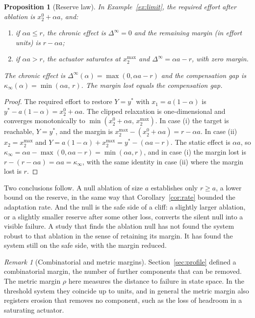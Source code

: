 \documentclass[11pt]{article}
\newtheorem{proposition}[theorem]{Proposition}
\theoremstyle{definition}
\theoremstyle{remark}
\newtheorem{remark}[theorem]{Remark}
\begin{document}
\begin{proposition}[Reserve law]\label{prop:reserve}
In Example~\ref{ex:limit}, the required effort after ablation is $x_2^0+\alpha a$, and:
\begin{enumerate}[label=(\roman*)]
\item if $\alpha a\le r$, the chronic effect is $\Delta^\infty=0$ and the remaining margin (in effort units) is $r-\alpha a$;
\item if $\alpha a>r$, the actuator saturates at $x_2^{\max}$ and $\Delta^\infty=\alpha a-r$, with zero margin.
\end{enumerate}
The chronic effect is $\Delta^\infty(\alpha)=\max(0,\alpha a-r)$ and the compensation gap is $\kappa_\infty(\alpha)=\min(\alpha a,\,r)$. The margin lost equals the compensation gap.
\end{proposition}
\begin{proof}
The required effort to restore $Y=y^*$ with $x_1=a(1-\alpha)$ is $y^*-a(1-\alpha)=x_2^0+\alpha a$. The clipped relaxation is one-dimensional and converges monotonically to $\min(x_2^0+\alpha a,\,x_2^{\max})$. In case (i) the target is reachable, $Y=y^*$, and the margin is $x_2^{\max}-(x_2^0+\alpha a)=r-\alpha a$. In case (ii) $x_2=x_2^{\max}$ and $Y=a(1-\alpha)+x_2^{\max}=y^*-(\alpha a-r)$. The static effect is $\alpha a$, so $\kappa_\infty=\alpha a-\max(0,\alpha a-r)=\min(\alpha a,r)$, and in case (i) the margin lost is $r-(r-\alpha a)=\alpha a=\kappa_\infty$, with the same identity in case (ii) where the margin lost is $r$.
\end{proof}

Two conclusions follow. A null ablation of size $a$ establishes only $r\ge a$, a lower bound on the reserve, in the same way that Corollary~\ref{cor:rate} bounded the adaptation rate. And the null is the safe side of a cliff: a slightly larger ablation, or a slightly smaller reserve after some other loss, converts the silent null into a visible failure. A study that finds the ablation null has not found the system robust to that ablation in the sense of retaining its margin. It has found the system still on the safe side, with the margin reduced.

\begin{remark}[Combinatorial and metric margins]
Section~\ref{sec:profile} defined a combinatorial margin, the number of further components that can be removed. The metric margin $\rho$ here measures the distance to failure in state space. In the threshold system they coincide up to units, and in general the metric margin also registers erosion that removes no component, such as the loss of headroom in a saturating actuator.
\end{remark}
\end{document}

